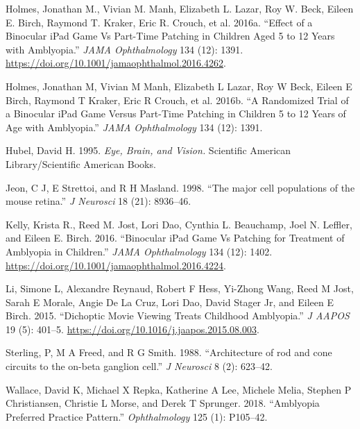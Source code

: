 \documentclass[
  letterpaper,
  DIV=11,
  numbers=noendperiod]{scrreprt}
\newlength{\cslhangindent}
\newlength{\cslentryspacingunit} %
\newenvironment{CSLReferences}[2] %
 {%
  \setlength{\parindent}{0pt}
  \ifodd #1
  \let\oldpar\par
  \def\par{\hangindent=\cslhangindent\oldpar}
  \fi
  \setlength{\parskip}{#2\cslentryspacingunit}
 }%
 {}
\begin{document}
\begin{CSLReferences}{1}{0}
\leavevmode{}%
Holmes, Jonathan M., Vivian M. Manh, Elizabeth L. Lazar, Roy W. Beck,
Eileen E. Birch, Raymond T. Kraker, Eric R. Crouch, et al. 2016a.
{``Effect of a Binocular iPad Game Vs Part-Time Patching in Children
Aged 5 to 12 Years with Amblyopia.''} \emph{JAMA Ophthalmology} 134
(12): 1391. \url{https://doi.org/10.1001/jamaophthalmol.2016.4262}.

\leavevmode{}%
Holmes, Jonathan M, Vivian M Manh, Elizabeth L Lazar, Roy W Beck, Eileen
E Birch, Raymond T Kraker, Eric R Crouch, et al. 2016b. {``A Randomized
Trial of a Binocular iPad Game Versus Part-Time Patching in Children 5
to 12 Years of Age with Amblyopia.''} \emph{JAMA Ophthalmology} 134
(12): 1391.

\leavevmode{}%
Hubel, David H. 1995. \emph{Eye, Brain, and Vision.} Scientific American
Library/Scientific American Books.

\leavevmode{}%
Jeon, C J, E Strettoi, and R H Masland. 1998. {``{The major cell
populations of the mouse retina}.''} \emph{J Neurosci} 18 (21):
8936--46.

\leavevmode{}%
Kelly, Krista R., Reed M. Jost, Lori Dao, Cynthia L. Beauchamp, Joel N.
Leffler, and Eileen E. Birch. 2016. {``Binocular iPad Game Vs Patching
for Treatment of Amblyopia in Children.''} \emph{JAMA Ophthalmology} 134
(12): 1402. \url{https://doi.org/10.1001/jamaophthalmol.2016.4224}.

\leavevmode{}%
Li, Simone L, Alexandre Reynaud, Robert F Hess, Yi-Zhong Wang, Reed M
Jost, Sarah E Morale, Angie De La Cruz, Lori Dao, David Stager Jr, and
Eileen E Birch. 2015. {``Dichoptic Movie Viewing Treats Childhood
Amblyopia.''} \emph{J AAPOS} 19 (5): 401--5.
\url{https://doi.org/10.1016/j.jaapos.2015.08.003}.

\leavevmode{}%
Sterling, P, M A Freed, and R G Smith. 1988. {``{Architecture of rod and
cone circuits to the on-beta ganglion cell}.''} \emph{J Neurosci} 8 (2):
623--42.

\leavevmode{}%
Wallace, David K, Michael X Repka, Katherine A Lee, Michele Melia,
Stephen P Christiansen, Christie L Morse, and Derek T Sprunger. 2018.
{``Amblyopia Preferred Practice Pattern{\textregistered}.''}
\emph{Ophthalmology} 125 (1): P105--42.


\end{CSLReferences}
\end{document}
